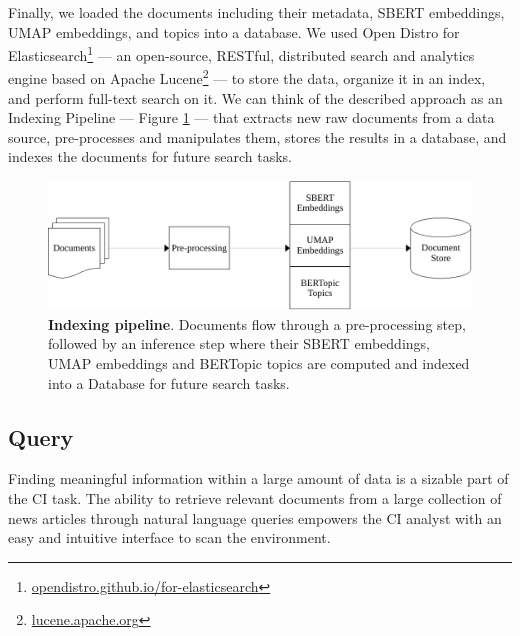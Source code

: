 \documentclass[a4paper]{article}
\begin{document}
Finally, we loaded the documents including their metadata, SBERT embeddings, UMAP embeddings, and topics into a database. We used Open Distro for Elasticsearch\footnote{\href{https://opendistro.github.io/for-elasticsearch/}{opendistro.github.io/for-elasticsearch}} — an open-source, RESTful, distributed search and analytics engine based on Apache Lucene\footnote{\href{https://lucene.apache.org/}{lucene.apache.org}} — to store the data, organize it in an index, and perform full-text search on it. We can think of the described approach as an Indexing Pipeline — Figure \ref{indexing_pipeline} — that extracts new raw documents from a data source, pre-processes and manipulates them, stores the results in a database, and indexes the documents for future search tasks.

\begin{figure}[H]
  \centering
  \includegraphics[scale=0.7]{./assets/indexing_pipeline}
  \caption{\textbf{Indexing pipeline}. Documents flow through a pre-processing step, followed by an inference step where their SBERT embeddings, UMAP embeddings and BERTopic topics are computed and indexed into a Database for future search tasks.}
  \label{indexing_pipeline}
\end{figure}

\subsection{Query} \label{query}
Finding meaningful information within a large amount of data is a sizable part of the CI task. The ability to retrieve relevant documents from a large collection of news articles through natural language queries empowers the CI analyst with an easy and intuitive interface to scan the environment.
\end{document}
